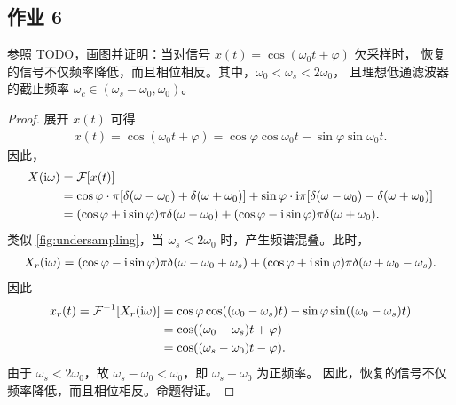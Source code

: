 \subsection{作业 6}

\begin{homework}
    参照 TODO，画图并证明：当对信号 $x(t) = \cos(\omega_0 t + \varphi)$ 欠采样时，
    恢复的信号不仅频率降低，而且相位相反。其中，$\omega_0 < \omega_s < 2\omega_0$，
    且理想低通滤波器的截止频率 $\omega_c \in (\omega_s - \omega_0, \omega_0)$。
\end{homework}

\begin{proof}
    展开 $x(t)$ 可得
    \begin{align*}
        x(t) = \cos(\omega_0 t + \varphi) = \cos\varphi\cos\omega_0 t- \sin\varphi \sin\omega_0 t.
    \end{align*}
    因此，
    \begin{align*}
        X(\mathrm{i}\omega) & = \mathcal{F}[x(t)] \\
        & = \cos\varphi\cdot \pi[\delta(\omega - \omega_0) + \delta(\omega + \omega_0)]
            + \sin\varphi\cdot \mathrm{i}\pi[\delta(\omega - \omega_0) - \delta(\omega + \omega_0)] \\
        & = (\cos\varphi + \mathrm{i}\sin\varphi)\pi\delta(\omega - \omega_0)
            + (\cos\varphi - \mathrm{i}\sin\varphi)\pi\delta(\omega + \omega_0).
    \end{align*}
    类似 \ref{fig:undersampling}，当 $\omega_s < 2\omega_0$ 时，产生频谱混叠。此时，
    \begin{align*}
        X_r(\mathrm{i}\omega) = (\cos\varphi - \mathrm{i}\sin\varphi)\pi\delta(\omega - \omega_0 + \omega_s)
            + (\cos\varphi + \mathrm{i}\sin\varphi)\pi\delta(\omega + \omega_0 - \omega_s).
    \end{align*}
    因此
    \begin{align*}
        x_r(t) = \mathcal{F}^{-1}[X_r(\mathrm{i}\omega)] & = \cos\varphi\cos((\omega_0 - \omega_s)t)
            - \sin\varphi\sin((\omega_0 - \omega_s)t) \\
        & = \cos((\omega_0 - \omega_s)t + \varphi) \\
        & = \cos((\omega_s - \omega_0)t - \varphi).
    \end{align*}
    由于 $\omega_s < 2\omega_0$，故 $\omega_s - \omega_0 < \omega_0$，即 $\omega_s - \omega_0$ 为正频率。
    因此，恢复的信号不仅频率降低，而且相位相反。命题得证。
\end{proof}

